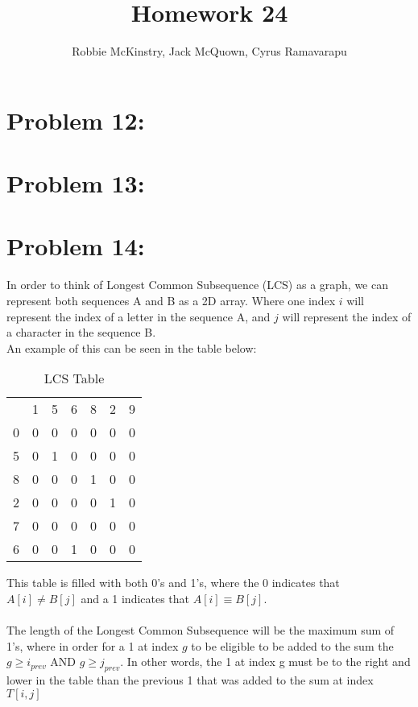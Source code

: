 \documentclass[12pt]{article}
\begin{document}
\title{Homework 24}
\author{Robbie McKinstry, Jack McQuown, Cyrus Ramavarapu}
\renewcommand{\today}{27 October 2016}
\renewcommand{\baselinestretch}{1.5}
\maketitle

\section*{Problem 12: }
\section*{Problem 13: }
\section*{Problem 14: }
In order to think of Longest Common Subsequence (LCS) as a graph, we can represent both sequences A and B as a 2D array. Where one index {$i$} will represent the index of a letter in the sequence A, and {$j$} will represent the index of a character in the sequence B.\\
An example of this can be seen in the table below:
\begin{table}[H]
\centering
\caption{LCS Table}
\label{my-label}
\begin{tabular}{ccccccc}
                       & 1 & 5 & 6 & 8 & 2 & 9 \\ \cline{2-7} 
\multicolumn{1}{c|}{0} & 0 & 0 & 0 & 0 & 0 & 0 \\
\multicolumn{1}{c|}{5} & 0 & 1 & 0 & 0 & 0 & 0 \\
\multicolumn{1}{c|}{8} & 0 & 0 & 0 & 1 & 0 & 0 \\
\multicolumn{1}{c|}{2} & 0 & 0 & 0 & 0 & 1 & 0 \\
\multicolumn{1}{c|}{7} & 0 & 0 & 0 & 0 & 0 & 0 \\
\multicolumn{1}{c|}{6} & 0 & 0 & 1 & 0 & 0 & 0
\end{tabular}
\end{table}
This table is filled with both 0's and 1's, where the 0 indicates that {$A[i] \neq B[j]$} and a 1 indicates that {$A[i] \equiv B[j]$}.\\\\
The length of the Longest Common Subsequence will be the maximum sum of 1's, where in order for a 1 at index {$g$} to be eligible to be added to the sum the {$g \geq i_{prev}$ AND $g \geq j_{prev}$}. In other words, the 1 at index g must be to the right and lower in the table than the previous 1 that was added to the sum at index {$T[i,j]$}\\\\
\end{document}
